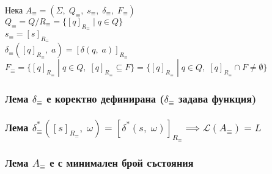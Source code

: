 \documentclass[12pt]{article}
\newcommand{\Lang}{\mathcal{L}}
\begin{document}
Нека $A_\equiv = (\Sigma, \; Q_\equiv, \; s_\equiv, \; \delta_\equiv, \; F_\equiv)$ \\

$Q_\equiv = Q/R_\equiv = \{[q]_{R_\equiv} \; | \; q \in Q\}$ \\

$s_\equiv = [s]_{R_\equiv}$ \\

$\delta_\equiv([q]_{R_\equiv}, \; a) = [\delta(q, \; a)]_{R_\equiv}$ \\

$F_\equiv = \{[q]_{R_\equiv} \; | \; q \in Q, \; [q]_{R_\equiv} \subseteq F\} = \{[q]_{R_\equiv} \; | \; q \in Q, \; [q]_{R_\equiv} \cap F \neq \emptyset\}$

\subsubsection*{Лема $\delta_\equiv$ е коректно дефинирана ($\delta_\equiv$ задава функция)}
\subsubsection*{Лема $\delta_\equiv^*([s]_{R_\equiv}, \; \omega) = [\delta^*(s, \; \omega)]_{R_\equiv} \implies \Lang(A_\equiv) = L$}
\subsubsection*{Лема $A_\equiv$ е с минимален брой състояния}
\end{document}
